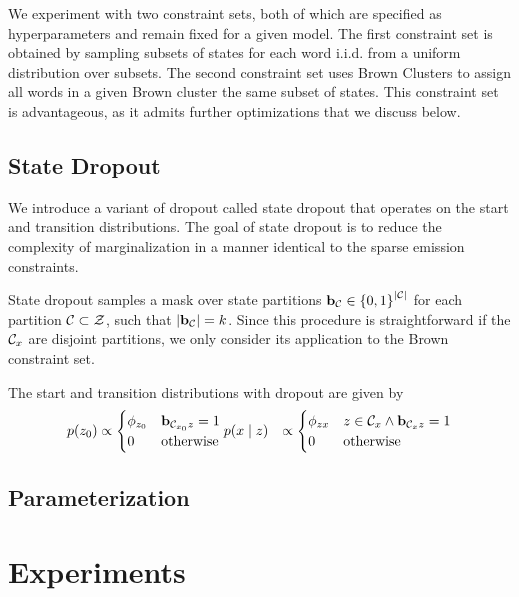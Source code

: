 \documentclass[12pt]{article}
\begin{document}
We experiment with two constraint sets, both of which are specified 
as hyperparameters and remain fixed for a given model.
The first constraint set is obtained by sampling subsets of
states for each word i.i.d. from a uniform distribution over subsets.
The second constraint set uses Brown Clusters \citep{brown1992}
to assign all words in a given Brown cluster the same subset of states.
This constraint set is advantageous, as it admits further optimizations
that we discuss below.

\subsection{State Dropout}
We introduce a variant of dropout called state dropout that operates on the
start and transition distributions.
The goal of state dropout is to reduce the complexity of marginalization in a manner
identical to the sparse emission constraints.

State dropout samples a mask over state partitions
$\mathbf{b}_{\mathcal{C}} \in \left\{0,1\right\}^{|\mathcal{C}|}$ for each partition $\mathcal{C} \subset \mathcal{Z}$,
such that $|\mathbf{b}_{\mathcal{C}}| = k$.
Since this procedure is straightforward if the $\mathcal{C}_x$ are disjoint partitions,
we only consider its application to the Brown constraint set.

The start and transition distributions with dropout are given by
\begin{equation}
\label{eqn:state_dropout}
\begin{aligned}
p(z_0) &\propto \begin{cases}
\phi_{z_0} & \mathbf{b}_{\mathcal{C}_{x_0} z} = 1\\
0 & \textrm{otherwise}\\
\end{cases}
p(x \mid z) &\propto \begin{cases}
\phi_{zx} & z \in \mathcal{C}_x \wedge \mathbf{b}_{\mathcal{C}_x z} = 1\\
0 & \textrm{otherwise}
\end{cases}
\end{aligned}
\end{equation}


\subsection{Parameterization}


\section{Experiments}
\end{document}
